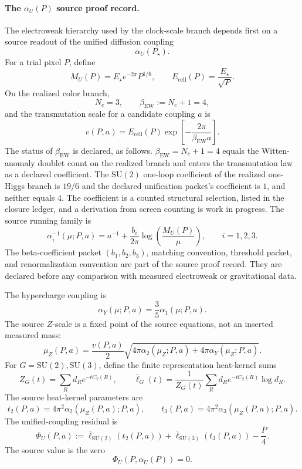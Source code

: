 \paragraph{The \(\alpha_U(P)\) source proof record.}
The electroweak hierarchy used by the clock-scale branch depends first on a source readout of the
unified diffusion coupling
\[
\alpha_U(P_\star).
\]
For a trial pixel \(P\), define
\[
M_U(P)=E_\star e^{-2\pi}P^{1/6},
\qquad
E_{\mathrm{cell}}(P)=\frac{E_\star}{\sqrt P}.
\]
On the realized color branch,
\[
N_c=3,
\qquad
\beta_{\mathrm{EW}}:=N_c+1=4,
\]
and the transmutation scale for a candidate coupling \(a\) is
\[
v(P,a)
=
E_{\mathrm{cell}}(P)
\exp\!\left[
-\frac{2\pi}{\beta_{\mathrm{EW}}a}
\right].
\]
The status of \(\beta_{\mathrm{EW}}\) is declared, as follows. \(\beta_{\mathrm{EW}}=N_c+1=4\) equals
the Witten-anomaly doublet count on the realized branch and enters the transmutation law as a
declared coefficient. The \(\mathrm{SU}(2)\) one-loop coefficient of the realized one-Higgs branch
is \(19/6\) and the declared unification packet's coefficient is \(1\), and neither equals \(4\).
The coefficient is a counted structural selection, listed in the closure ledger, and a
derivation from screen counting is work in progress.
The source running family is
\[
\alpha_i^{-1}(\mu;P,a)
=
a^{-1}
+
\frac{b_i}{2\pi}
\log\!\left(\frac{M_U(P)}{\mu}\right),
\qquad i=1,2,3.
\]
The beta-coefficient packet \((b_1,b_2,b_3)\), matching convention, threshold packet, and
renormalization convention are part of the source proof record. They are declared before any
comparison with measured electroweak or gravitational data.

The hypercharge coupling is
\[
\alpha_Y(\mu;P,a)=\frac35\alpha_1(\mu;P,a).
\]
The source \(Z\)-scale is a fixed point of the source equations, not an inserted measured mass:
\[
\mu_Z(P,a)
=
\frac{v(P,a)}{2}
\sqrt{
4\pi\alpha_2(\mu_Z;P,a)
+
4\pi\alpha_Y(\mu_Z;P,a)
}.
\]
For \(G=\mathrm{SU}(2),\mathrm{SU}(3)\), define the finite representation heat-kernel sums
\[
Z_G(t)=\sum_R d_R e^{-tC_2(R)},
\qquad
\bar\ell_G(t)
=
\frac{1}{Z_G(t)}
\sum_R d_R e^{-tC_2(R)}\log d_R.
\]
The source heat-kernel parameters are
\[
t_2(P,a)=4\pi^2\alpha_2(\mu_Z(P,a);P,a),
\qquad
t_3(P,a)=4\pi^2\alpha_3(\mu_Z(P,a);P,a).
\]
The unified-coupling residual is
\[
\Phi_U(P,a)
:=
\bar\ell_{\mathrm{SU}(2)}(t_2(P,a))
+
\bar\ell_{\mathrm{SU}(3)}(t_3(P,a))
-
\frac{P}{4}.
\]
The source value is the zero
\[
\Phi_U(P,\alpha_U(P))=0.
\]

